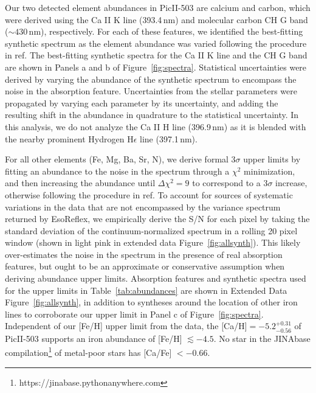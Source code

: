 \documentclass[pdflatex,sn-nature]{sn-jnl}%
\theoremstyle{thmstyleone}%
\theoremstyle{thmstyletwo}%
\theoremstyle{thmstylethree}%
\begin{document}
Our two detected element abundances in PicII-503 are calcium and carbon, which were derived using the Ca II K line (393.4\,nm) and molecular carbon CH G band ($\sim430$\,nm), respectively.
For each of these features, we identified the best-fitting synthetic spectrum as the element abundance was varied following the procedure in ref\cite{jlh+20}. 
The best-fitting synthetic spectra for the Ca II K line and the CH G band are shown in Panels a and b of Figure~\ref{fig:spectra}.
Statistical uncertainties were derived by varying the abundance of the synthetic spectrum to encompass the noise in the absorption feature. Uncertainties from the stellar parameters were propagated by varying each parameter by its uncertainty, and adding the resulting shift in the abundance in quadrature to the statistical uncertainty.
In this analysis, we do not analyze the Ca II H line (396.9\,nm) as it is blended with the nearby prominent Hydrogen H$\epsilon$ line (397.1\,nm).

For all other elements (Fe, Mg, Ba, Sr, N), we derive formal 3$\sigma$ upper limits by fitting an abundance to the noise in the spectrum through a $\chi^2$ minimization, and then increasing the abundance until $\Delta\chi^2=9$ to correspond to a 3$\sigma$ increase, otherwise following the procedure in ref\cite{jls+20}.
To account for sources of systematic variations in the data that are not encompassed by the variance spectrum returned by EsoReflex, we empirically derive the S/N for each pixel by taking the standard deviation of the continuum-normalized spectrum in a rolling 20 pixel window (shown in light pink in extended data Figure~\ref{fig:allsynth}). 
This likely over-estimates the noise in the spectrum in the presence of real absorption features, but ought to be an approximate or conservative assumption when deriving abundance upper limits.
Absorption features and synthetic spectra used for the upper limits in Table~\ref{tab:abundances} are shown in Extended Data Figure~\ref{fig:allsynth}, in addition to syntheses around the location of other iron lines to corroborate our upper limit in Panel c of Figure~\ref{fig:spectra}.
Independent of our [Fe/H] upper limit from the data, the [Ca/H]$=-5.2^{+0.31}_{-0.56}$ of PicII-503 supports an iron abundance of [Fe/H] $\lesssim -4.5$.
No star in the JINAbase compilation\footnote{https://jinabase.pythonanywhere.com} of metal-poor stars has [Ca/Fe] $< -0.66$\cite{af+18}.
\end{document}

